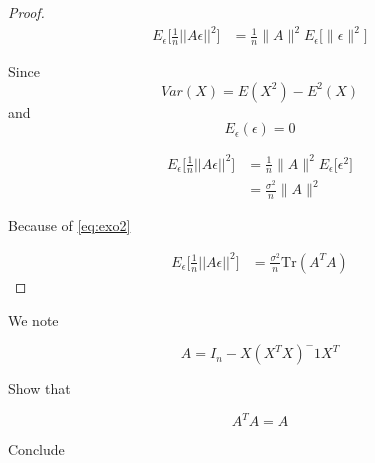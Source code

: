 \begin{proof}
    \begin{align*}
        E_\epsilon \Big[ \frac{1}{n} ||A\epsilon ||^2 \Big] &= 
            \frac{1}{n} \| A \|^2 E_\epsilon \Big[  \| \epsilon \|^2 \Big]
    \end{align*}

    Since
    \begin{equation}
        Var(X) = E(X^2) - E^2(X) 
    \end{equation}
    and
    \begin{equation}
        E_\epsilon (\epsilon) = 0
    \end{equation}

    \begin{align*}
        E_\epsilon \Big[ \frac{1}{n} ||A\epsilon ||^2 \Big] &=            \frac{1}{n} \| A \|^2 E_\epsilon \Big[ \epsilon ^2 \Big]\\
            &= \frac{\sigma^2}{n} \| A \|^2
    \end{align*}
    
    Because of \eqref{eq:exo2}
    
    \begin{align*}
        E_\epsilon \Big[ \frac{1}{n} ||A\epsilon ||^2 \Big] &=  \frac{\sigma^2}{n} \mathrm {Tr} (A^T A)
    \end{align*}
\end{proof}


We note

\begin{equation}
    A = I_n - X (X^T X)^-1 X^T
\end{equation}

Show that

\begin{equation}
    A^T A = A
\end{equation}


Conclude
